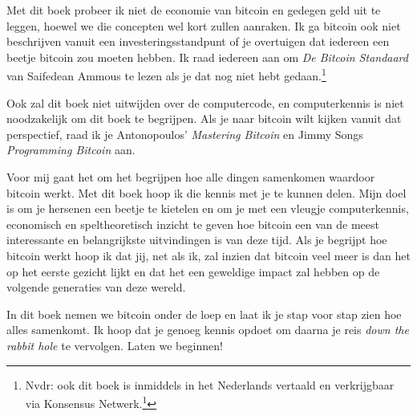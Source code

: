 Met dit boek probeer ik niet de economie van bitcoin en gedegen geld uit te leggen, hoewel we die concepten wel kort zullen aanraken. Ik ga bitcoin ook niet beschrijven vanuit een investeringsstandpunt of je overtuigen dat iedereen een beetje bitcoin zou moeten hebben. Ik raad iedereen aan om \textit{De Bitcoin Standaard} van Saifedean Ammous te lezen als je dat nog niet hebt gedaan.\footnote{Nvdr: ook dit boek is inmiddels in het Nederlands vertaald en verkrijgbaar via Konsensus Netwerk.\footnote{\url{https://konsensus.network/shop/}}}

Ook zal dit boek niet uitwijden over de computercode, en computerkennis is niet noodzakelijk om dit boek te begrijpen. Als je naar bitcoin wilt kijken vanuit dat perspectief, raad ik je Antonopoulos' \textit{Mastering Bitcoin} en Jimmy Songs \textit{Programming Bitcoin} aan.

Voor mij gaat het om het begrijpen hoe alle dingen samenkomen waardoor bitcoin werkt. Met dit boek hoop ik die kennis met je te kunnen delen. Mijn doel is om je hersenen een beetje te kietelen en om je met een vleugje computerkennis, economisch en speltheoretisch inzicht te geven hoe bitcoin een van de meest interessante en belangrijkste uitvindingen is van deze tijd. Als je begrijpt hoe bitcoin werkt hoop ik dat jij, net als ik, zal inzien dat bitcoin veel meer is dan het op het eerste gezicht lijkt en dat het een geweldige impact zal hebben op de volgende generaties van deze wereld.

In dit boek nemen we bitcoin onder de loep en laat ik je stap voor stap zien hoe alles samenkomt. Ik hoop dat je genoeg kennis opdoet om daarna je reis \textit{down the rabbit hole} te vervolgen. Laten we beginnen! 

\clearpage


